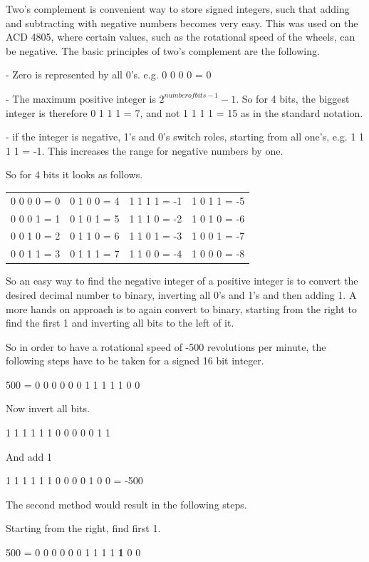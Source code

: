 Two's complement is convenient way to store signed integers, such that adding and subtracting with negative numbers becomes very easy. This was used on the ACD 4805, where certain values, such as the rotational speed of the wheels, can be negative. 
The basic principles of two's complement are the following.

- Zero is represented by all 0's. 
e.g. 0 0 0 0 = 0

- The maximum positive integer is $ 2^{number of bits-1}-1 $.
So for 4 bits, the biggest integer is therefore 0 1 1 1 = 7, and not 1 1 1 1 = 15 as in the standard notation.

- if the integer is negative, 1's and 0's switch roles, starting from all one's, e.g. 1 1 1 1 = -1. This increases the range for negative numbers by one.

So for 4 bits it looks as follows.

\begin{tabular}{llll}
	0 0 0 0 = 0 & 0 1 0 0 = 4 & 1 1 1 1 = -1 & 1 0 1 1 = -5\\
	0 0 0 1 = 1 & 0 1 0 1 = 5 & 1 1 1 0 = -2 & 1 0 1 0 = -6\\
	0 0 1 0 = 2 & 0 1 1 0 = 6 & 1 1 0 1 = -3 & 1 0 0 1 = -7\\
	0 0 1 1 = 3 & 0 1 1 1 = 7 & 1 1 0 0 = -4 & 1 0 0 0 = -8
\end{tabular}

So an easy way to find the negative integer of a positive integer is to convert the desired decimal number to binary, inverting all 0's and 1's and then adding 1. A more hands on approach is to again convert to binary, starting from the right to find the first 1 and inverting all bits to the left of it.

So in order to have a rotational speed of -500 revolutions per minute, the following steps have to be taken for a signed 16 bit integer.

500 = 0 0 0 0  0 0 1  1 1 1  1 0 0

Now invert all bits.

1 1 1 1  1 1 0  0 0 0  0 1 1

And add 1

1 1 1 1  1 1 0  0 0 0  1 0 0 = -500

The second method would result in the following steps.

Starting from the right, find first 1.

500 = 0 0 0 0  0 0 1  1 1 1  \textbf{1} 0 0

